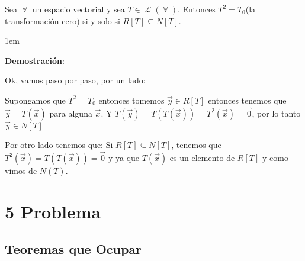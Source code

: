 \documentclass[12pt, fleqn]{article}                             %
\newenvironment{SmallIndentation}[1][0.75em]                    %
        {\begin{adjustwidth}{#1}{}\begin{footnotesize}}             %
        {\end{footnotesize}\end{adjustwidth}}                       %
\theoremstyle{break}                                            %
\DeclareMathOperator \VectorSet    {\mathbb{V}}                 %
\DeclareMathOperator \LinTrans {\mathcal{T}}                    %
\DeclareMathOperator \Laplace {\mathcal{L}}                     %
\begin{document}
    Sea $\VectorSet$ un espacio vectorial y sea $T \in \Laplace(\VectorSet)$. Entonces 
    $T^2 = T_0$(la transformación cero) si y solo si $R[T] \subseteq N[T]$.

    \begin{SmallIndentation}[1em]
        \textbf{Demostración}:
        
        Ok, vamos paso por paso, por un lado:

        Supongamos que $T^2 = T_0$ entonces tomemos $\vec y \in R[T]$ entonces 
        tenemos que $\vec y = T(\vec x)$ para alguna $\vec x$.
        Y $T(\vec y) = T(T(\vec x)) = T^2(\vec x) = \vec 0$, por lo tanto $\vec y \in N[T]$

        Por otro lado tenemos que:
        Si $R[T] \subseteq N[T]$, tenemos que $T^2(\vec x) = T(T(\vec x)) = \vec 0$ 
        y ya que $T(\vec x)$ es un elemento de $R[T]$ y como vimos de $N(T)$.
    
    \end{SmallIndentation}




\clearpage
\section{5 Problema}


    \subsection{Teoremas que Ocupar}
\end{document}
